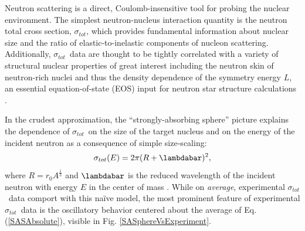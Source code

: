 \documentclass[twocolumn,secnumarabic,amssymb, nobibnotes, aps, prl,
superscriptaddress, nobalancelastpage]{revtex4}
\newcommand{\tot}{\ensuremath{\sigma_{tot}}}
\newcommand{\totRD}{\ensuremath{\sigma_{A,A'}}(E)}
\begin{document}
\author{M.C.~Atkinson}
\author{W.H.~Dickhoff}

\author{H. Y. Lee}
\author{M. Devlin}
\author{N. Fotiadis}
\author{S. Mosby}
\maketitle

Neutron scattering is a direct, Coulomb-insensitive tool for probing the nuclear
environment. The simplest neutron-nucleus interaction quantity is 
the neutron total cross section, \tot, which provides fundamental information about
nuclear size and the ratio of elastic-to-inelastic components of nucleon 
scattering. Additionally, \tot\ data are thought to be tightly correlated with
a variety of structural nuclear properties of great interest
including the neutron skin of neutron-rich nuclei
\cite{Mahzoon2017} and thus the density dependence of the symmetry energy $L$,
an essential equation-of-state (EOS) input for neutron star
structure calculations \cite{Fattoyev2012, Vinas2014, Brown2000}.

In the crudest approximation, the ``strongly-absorbing sphere'' picture
explains the dependence of \tot\ on the size of the target nucleus and on the
energy of the incident neutron as a consequence of simple size-scaling:
\begin{equation} \label{SASAbsolute}
    \sigma_{tot}(E) = 2\pi(R + \lambdabar)^{2},
\end{equation}
where $R=r_{0}A^{\frac{1}{3}}$ and $\lambdabar$ is the reduced wavelength
of the incident neutron with energy $E$ in the center of mass \cite{Fernbach1949, Satchler1980}. 
While on \textit{average}, experimental \tot\ data comport with this na\"ive
model, the most prominent feature of experimental \tot\ data is the oscillatory
behavior centered about the average of Eq. (\ref{SASAbsolute}), visible in Fig.
\ref{SASphereVsExperiment}.
\end{document}
